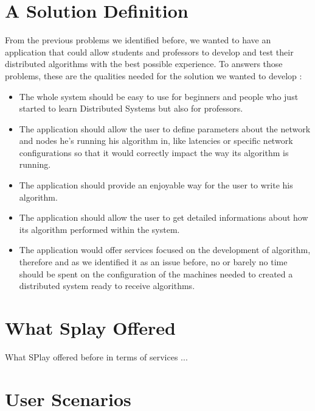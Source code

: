 \documentclass{eplmastersthesis}
\begin{document}

    \section{A Solution Definition} %

      From the previous problems we identified before, we wanted to have an
      application that could allow students and professors to develop and
      test their distributed algorithms with the best possible experience.
      To answers those problems, these are the qualities needed for the
      solution we wanted to develop :

      \begin{itemize}
        \item The whole system should be easy to use for beginners and people
        who just started to learn Distributed Systems but also for professors.
        \item The application should allow the user to define parameters about
        the network and nodes he's running his algorithm in, like latencies
        or specific network configurations so that it would correctly
        impact the way its algorithm is running.
        \item The application should provide an enjoyable way for the user
        to write his algorithm.
        \item The application should allow the user to get detailed informations
        about how its algorithm performed within the system.
        \item The application would offer services focused on the development
        of algorithm, therefore and as we identified it as an issue before, no
        or barely no time should be spent on the configuration of the machines
        needed to created a distributed system ready to receive algorithms.
      \end{itemize}

    \section{What Splay Offered} %

      What SPlay offered before in terms of services ...

    \section{User Scenarios} %
\end{document}
